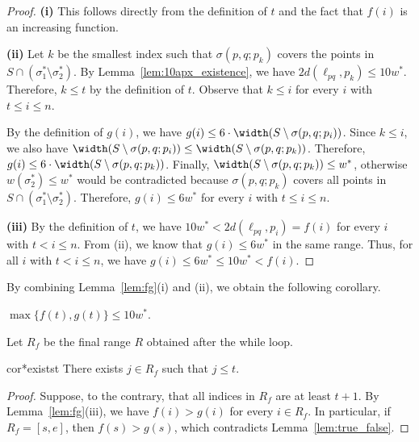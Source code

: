 \begin{proof}
    \textbf{\textsf{(i)}} This follows directly from the definition of $t$ and the fact that $f(i)$ is an increasing function.

    \textbf{\textsf{(ii)}}  Let $k$ be the smallest index such that $\sigma(p, q; p_k)$ covers the points in $S\cap (\sigma_1^* \setminus \sigma_2^*)$. 
    By Lemma~\ref{lem:10apx_existence}, we have $2d(\ell_{pq}, p_k) \le 10w^*$. 
    Therefore, $k\le t$ by the definition of $t$. 
    Observe that $k \le i$ for every $i$ with $t\le i\le n$. 

    By the definition of $g(i)$, we have $g(i) \le 6\cdot \width(S \setminus \sigma(p, q; p_i))$.
    Since $k \le i$, we also have $\width(S\setminus \sigma(p,q;p_{i})) \le \width(S\setminus \sigma(p,q;p_{k})) $.
    Therefore, $g(i) \le 6\cdot \width(S \setminus \sigma(p, q; p_k))$.
    Finally, $\width(S \setminus \sigma(p, q; p_k)) \le w^*$, otherwise $w(\sigma_2^*) \le w^*$ would be contradicted because $\sigma(p, q; p_k)$ covers all points in $S \cap (\sigma_1^* \setminus \sigma_2^*)$.
    Therefore, $g(i) \le 6 w^*$ for every $i$ with $t \le i \le n$.
    
    \textbf{\textsf{(iii)}}  By the definition of $t$, we have  $10w^* < 2d(\ell_{pq}, p_i) = f(i)$ for every $i$ with $t < i \le n$. 
    From {\textsf{(ii)}}, we know that $g(i) \le 6 w^*$ in the same range.
    Thus, for all $i$ with $t < i \le n$, we have $g(i) \le 6w^* \le 10w^* < f(i)$. 
\end{proof}


By combining Lemma~\ref{lem:fg}(i) and (ii), we obtain the following corollary. 


\begin{corollary}
    \label{cor:fgt}
    $\max \{f(t) , g(t)\} \le 10w^*$.
\end{corollary}


Let $R_f$ be the final range $R$ obtained after the while loop. 

\begin{restatable}{cor*}{existst}
    \label{cor:exists_t}
    There exists $j\in R_f$ such that $j \le t$. 
\end{restatable}


\begin{proof}
Suppose, to the contrary, that all indices in $R_f$ are at least $t+1$. 
By Lemma~\ref{lem:fg}(iii), we have $f(i) > g(i)$ for every $i \in R_f$.
In particular, if $R_f = [s, e]$, then $f(s) > g(s)$, which contradicts Lemma~\ref{lem:true_false}.
\end{proof}


